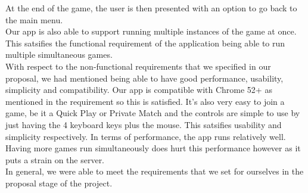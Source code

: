 \documentclass[11pt, oneside]{article}   	%
\begin{document}
At the end of the game, the user is then presented with an option to go back to the main menu.\\

Our app is also able to support running multiple instances of the game at once. This satsifies
the functional requirement of the application being able to run multiple simultaneous games.\\

With respect to the non-functional requirements that we specified in our proposal, we had
mentioned being able to have good performance, usability, simplicity and compatibility.
Our app is compatible with Chrome 52+ as mentioned in the requirement so this is satisfied.
It's also very easy to join a game, be it a Quick Play or Private Match and the controls are
simple to use by just having the 4 keyboard keys plus the mouse. This satsifies usability and
simplicity respectively. In terms of performance, the app runs relatively well. Having more
games run simultaneously does hurt this performance however as it puts a strain on the server.\\

In general, we were able to meet the requirements that we set for ourselves in the proposal
stage of the project.
\end{document}
